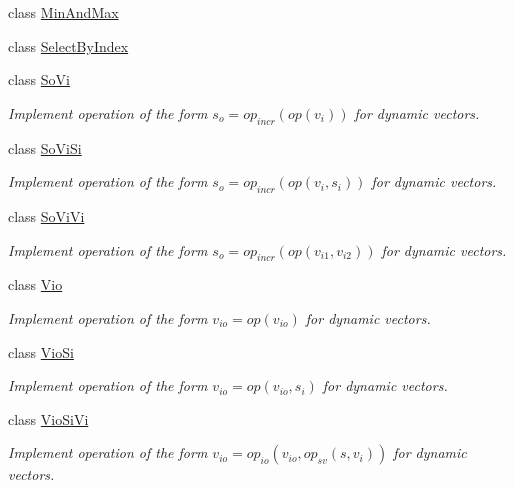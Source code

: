 \begin{DoxyCompactItemize}
\item 
class \hyperlink{classvct_dynamic_vector_loop_engines_1_1_min_and_max}{Min\-And\-Max}
\item 
class \hyperlink{classvct_dynamic_vector_loop_engines_1_1_select_by_index}{Select\-By\-Index}
\item 
class \hyperlink{classvct_dynamic_vector_loop_engines_1_1_so_vi}{So\-Vi}
\begin{DoxyCompactList}\small\item\em Implement operation of the form $s_o = op_{incr}(op(v_i))$ for dynamic vectors. \end{DoxyCompactList}\item 
class \hyperlink{classvct_dynamic_vector_loop_engines_1_1_so_vi_si}{So\-Vi\-Si}
\begin{DoxyCompactList}\small\item\em Implement operation of the form $s_o = op_{incr}(op(v_i, s_i))$ for dynamic vectors. \end{DoxyCompactList}\item 
class \hyperlink{classvct_dynamic_vector_loop_engines_1_1_so_vi_vi}{So\-Vi\-Vi}
\begin{DoxyCompactList}\small\item\em Implement operation of the form $s_o = op_{incr}(op(v_{i1}, v_{i2}))$ for dynamic vectors. \end{DoxyCompactList}\item 
class \hyperlink{classvct_dynamic_vector_loop_engines_1_1_vio}{Vio}
\begin{DoxyCompactList}\small\item\em Implement operation of the form $v_{io} = op(v_{io})$ for dynamic vectors. \end{DoxyCompactList}\item 
class \hyperlink{classvct_dynamic_vector_loop_engines_1_1_vio_si}{Vio\-Si}
\begin{DoxyCompactList}\small\item\em Implement operation of the form $ v_{io} = op(v_{io}, s_i)$ for dynamic vectors. \end{DoxyCompactList}\item 
class \hyperlink{classvct_dynamic_vector_loop_engines_1_1_vio_si_vi}{Vio\-Si\-Vi}
\begin{DoxyCompactList}\small\item\em Implement operation of the form $v_{io} = op_{io}(v_{io}, op_{sv}(s, v_i))$ for dynamic vectors. \end{DoxyCompactList}\item 

\end{DoxyCompactItemize}
